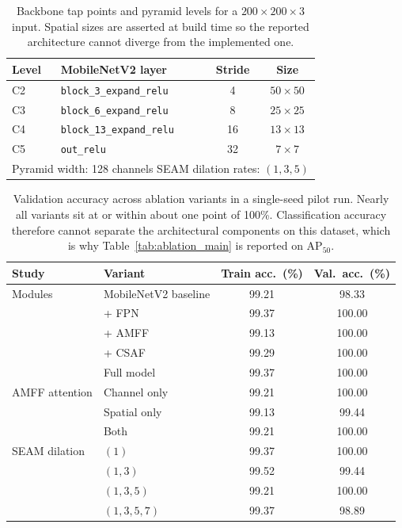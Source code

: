 \begin{table}[t]
\centering
\caption{Backbone tap points and pyramid levels for a $200\times200\times3$ input. Spatial sizes are asserted at build time so the reported architecture cannot diverge from the implemented one.}
\label{tab:architecture}
\renewcommand{\arraystretch}{1.15}
\begin{tabular}{llcc}
\toprule
\textbf{Level} & \textbf{MobileNetV2 layer} & \textbf{Stride} & \textbf{Size} \\
\midrule
C2 & \texttt{block\_3\_expand\_relu} & 4 & $50\times50$ \\
C3 & \texttt{block\_6\_expand\_relu} & 8 & $25\times25$ \\
C4 & \texttt{block\_13\_expand\_relu} & 16 & $13\times13$ \\
C5 & \texttt{out\_relu} & 32 & $7\times7$ \\
\midrule
\multicolumn{4}{l}{Pyramid width: 128 channels \quad SEAM dilation rates: $(1,3,5)$} \\
\bottomrule
\end{tabular}
\end{table}


\begin{table}[t]
\centering
\caption{Validation accuracy across ablation variants in a single-seed pilot run. Nearly all variants sit at or within about one point of 100\%. Classification accuracy therefore cannot separate the architectural components on this dataset, which is why Table~\ref{tab:ablation_main} is reported on AP$_{50}$.}
\label{tab:saturation}
\renewcommand{\arraystretch}{1.15}
\begin{tabular}{llcc}
\toprule
\textbf{Study} & \textbf{Variant} & \textbf{Train acc.\ (\%)} & \textbf{Val.\ acc.\ (\%)} \\
\midrule
Modules & MobileNetV2 baseline & 99.21 & 98.33 \\
 & + FPN & 99.37 & 100.00 \\
 & + AMFF & 99.13 & 100.00 \\
 & + CSAF & 99.29 & 100.00 \\
 & Full model & 99.37 & 100.00 \\
\midrule
AMFF attention & Channel only & 99.21 & 100.00 \\
 & Spatial only & 99.13 & 99.44 \\
 & Both & 99.21 & 100.00 \\
\midrule
SEAM dilation & $(1)$ & 99.37 & 100.00 \\
 & $(1,3)$ & 99.52 & 99.44 \\
 & $(1,3,5)$ & 99.21 & 100.00 \\
 & $(1,3,5,7)$ & 99.37 & 98.89 \\
\bottomrule
\end{tabular}
\end{table}


